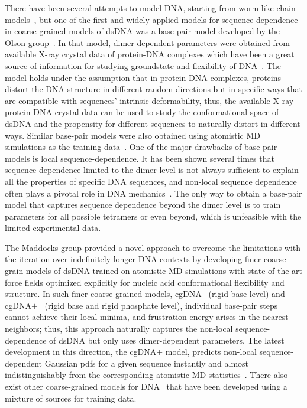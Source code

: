 There have been several attempts to model DNA, starting from worm-like chain models~\cite{kratky1949,shimada1980statistical}, but one of the first and widely applied models for sequence-dependence in coarse-grained models of dsDNA was a base-pair model 
developed by the Olson group~\cite{xraydata}. 
In that model, dimer-dependent parameters were obtained from available X-ray crystal data of protein-DNA complexes which have been a great source of information for studying groundstate and flexibility of DNA~\cite{neidle2021beyond}. 
The model holds under the assumption that in protein-DNA complexes, proteins distort the DNA structure in different random directions but in specific ways that are compatible with sequences' intrinsic deformability,
thus, the available X-ray protein-DNA crystal data can be used to study the conformational space of dsDNA and the propensity for different sequences to naturally distort in different ways.
Similar base-pair models were also obtained using atomistic MD simulations as the training data~\cite{lankavs2003dna,gonzalez2001extracting}.
One of the major drawbacks of base-pair models is local sequence-dependence. It has been shown several times that sequence dependence limited to the dimer level is not always sufficient to explain all the properties of specific DNA sequences, and non-local
sequence dependence often plays a pivotal role in DNA mechanics~\cite{lavery2010systematic,yanagi1991analysis,packer2000sequence,arauzo2005sequence,perez2008towards,fujii2007sequence}. 
The only way to obtain a base-pair model that captures sequence dependence beyond the dimer level is to train parameters for all possible tetramers or even beyond, which is unfeasible with the limited experimental data.

The Maddocks group provided a novel approach to overcome the limitations with the iteration over indefinitely longer DNA contexts by developing finer coarse-grain models of dsDNA trained on atomistic MD simulations with state-of-the-art force fields optimized explicitly for nucleic acid conformational flexibility and structure.
In such finer coarse-grained models,  cgDNA~\cite{cgDNA1,de2018cgdnaweb,petkevivciute2014cgdna}
(rigid-base level) and cgDNA$+$~\cite{patelithesis} (rigid base and rigid phosphate level), individual base-pair
steps cannot achieve their local minima, and frustration energy arises in the nearest-neighbors; thus, this approach naturally captures the non-local sequence-dependence of dsDNA but only uses dimer-dependent parameters.
The latest development in this direction, the cgDNA$+$ model, predicts non-local sequence-dependent Gaussian pdfs for a given sequence instantly and almost indistinguishably from the corresponding atomistic MD statistics~\cite{patelithesis}. 
There also exist other coarse-grained models for DNA~\cite{oxdna2,3spn,dnamartini} that have been developed using a mixture of sources for training data.

